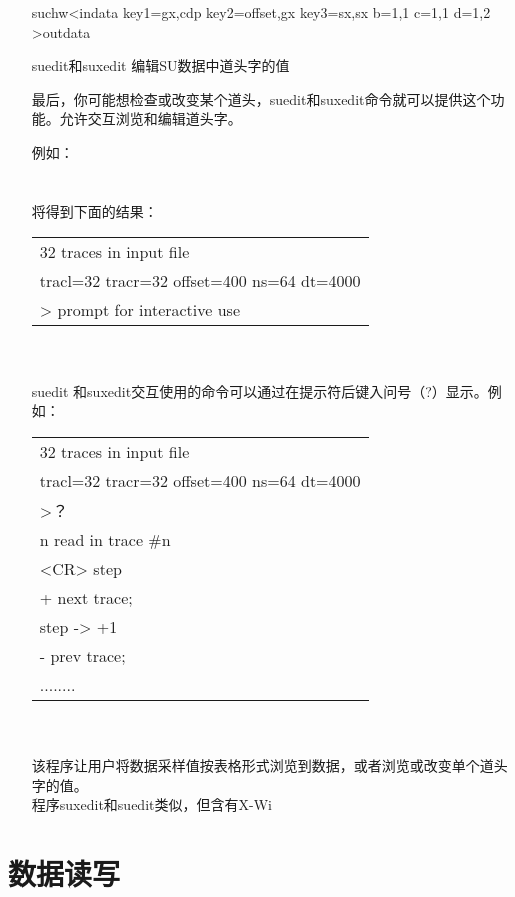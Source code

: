 \begin{enumerate}
	suchw<indata key1=gx,cdp key2=offset,gx key3=sx,sx b=1,1 c=1,1 d=1,2 >outdata
	\item[suedit和suxedit] 编辑SU数据中道头字的值\par
	最后，你可能想检查或改变某个道头，suedit和suxedit命令就可以提供这个功能。允许交互浏览和编辑道头字。\par
	例如：\\
	\\
	\\
	将得到下面的结果：\\
	\begin{tabular}{|l|}
		\toprule
		32 traces in input file\\
		tracl=32 tracr=32 offset=400 ns=64 dt=4000\\
		>  prompt for interactive use\\
		\bottomrule
	\end{tabular}\\\\
	suedit 和suxedit交互使用的命令可以通过在提示符后键入问号（?）显示。例如：\\
	\begin{tabular}{|l|}
	\toprule
	32 traces in input file\\
	tracl=32 tracr=32 offset=400 ns=64 dt=4000\\
	>？\\
	n  read in trace \#n\\
	<CR>   step	\\
	+    next trace;\\ 	
	step -> +1\\	
	-  prev trace;  \\  	
	........\\
	\bottomrule
	\end{tabular}\\\\
	该程序让用户将数据采样值按表格形式浏览到数据，或者浏览或改变单个道头字的值。\\
	程序suxedit和suedit类似，但含有X-Wi
\end{enumerate}             
     

\section{数据读写}

